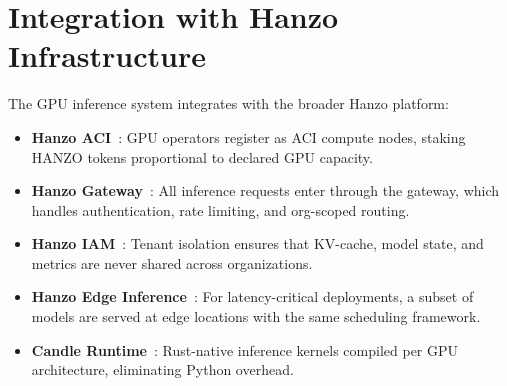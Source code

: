 \section{Integration with Hanzo Infrastructure}

\label{sec:integration}

The GPU inference system integrates with the broader Hanzo platform:
\begin{itemize}[leftmargin=1.1em]
    \item \textbf{Hanzo ACI}~\cite{hanzoaci}: GPU operators register as ACI
    compute nodes, staking HANZO tokens proportional to declared GPU capacity.
    \item \textbf{Hanzo Gateway}~\cite{hanzogateway}: All inference requests
    enter through the gateway, which handles authentication, rate limiting, and
    org-scoped routing.
    \item \textbf{Hanzo IAM}~\cite{hanzoiam}: Tenant isolation ensures that
    KV-cache, model state, and metrics are never shared across organizations.
    \item \textbf{Hanzo Edge Inference}~\cite{hanzoedge}: For latency-critical
    deployments, a subset of models are served at edge locations with the same
    scheduling framework.
    \item \textbf{Candle Runtime}~\cite{hanzocandle}: Rust-native inference
    kernels compiled per GPU architecture, eliminating Python overhead.
\end{itemize}

